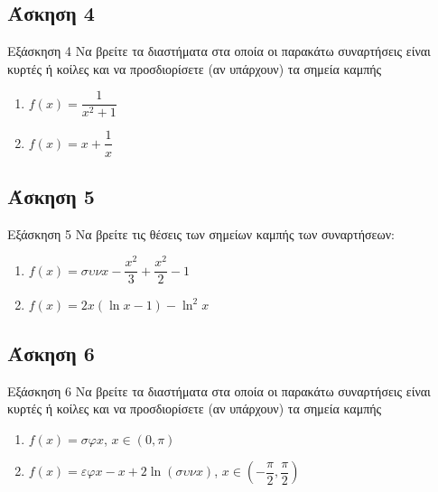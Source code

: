 \documentclass[greek]{beamer}
\begin{document}
\subsection{Άσκηση 4}
\begin{frame}[label=Άσκηση4,t]{Εξάσκηση 4}
 Να βρείτε τα διαστήματα στα οποία οι παρακάτω συναρτήσεις είναι κυρτές ή κοίλες και να προσδιορίσετε (αν υπάρχουν) τα σημεία καμπής
 \begin{enumerate}
  \item<1-> $f(x)=\dfrac{1}{x^2+1}$
  \item<2-> $f(x)=x+\dfrac{1}{x}$
 \end{enumerate}

\end{frame}

\subsection{Άσκηση 5}
\begin{frame}[label=Άσκηση5,t]{Εξάσκηση 5}
 Να βρείτε τις θέσεις των σημείων καμπής των συναρτήσεων:
 \begin{enumerate}
  \item<1-> $f(x)=συνx-\dfrac{x^2}{3}+\dfrac{x^2}{2}-1$
  \item<2-> $f(x)=2x(\ln x-1)-\ln^2x$
 \end{enumerate}

\end{frame}

\subsection{Άσκηση 6}
\begin{frame}[label=Άσκηση6,t]{Εξάσκηση 6}
 Να βρείτε τα διαστήματα στα οποία οι παρακάτω συναρτήσεις είναι κυρτές ή κοίλες και να προσδιορίσετε (αν υπάρχουν) τα σημεία καμπής
 \begin{enumerate}
  \item<1-> $f(x)=σφx$, $x\in (0,\pi)$
  \item<2-> $f(x)=εφx-x+2\ln (συνx)$, $x\in (-\dfrac{\pi}{2},\dfrac{\pi}{2})$
 \end{enumerate}

\end{frame}
\end{document}
